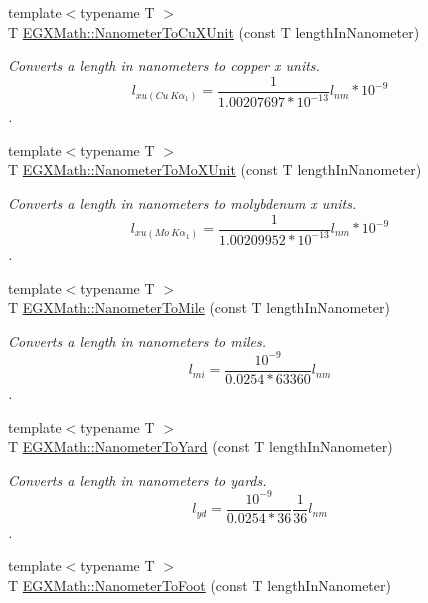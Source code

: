 \begin{DoxyCompactItemize}
{\footnotesize template$<$typename T $>$ }\\T \mbox{\hyperlink{group___e_g_x_math-_conversions-_length_conversions-_s_i-_nanometer-_non-_s_i_ga59399657caa5a9c81df2ffbe1ff7683c}{E\+G\+X\+Math\+::\+Nanometer\+To\+Cu\+X\+Unit}} (const T length\+In\+Nanometer)
\begin{DoxyCompactList}\small\item\em Converts a length in nanometers to copper x units. \[ l_{xu(Cu\ K\alpha_1)}= \frac{1}{1.00207697*10^{-13}} l_{nm} * 10^{-9}\]. \end{DoxyCompactList}\item 
{\footnotesize template$<$typename T $>$ }\\T \mbox{\hyperlink{group___e_g_x_math-_conversions-_length_conversions-_s_i-_nanometer-_non-_s_i_gacc6d7fa95c35687718c816df3c95c7b5}{E\+G\+X\+Math\+::\+Nanometer\+To\+Mo\+X\+Unit}} (const T length\+In\+Nanometer)
\begin{DoxyCompactList}\small\item\em Converts a length in nanometers to molybdenum x units. \[ l_{xu(Mo\ K\alpha_1)}=\frac{1}{1.00209952*10^{-13}} l_{nm} * 10^{-9}\]. \end{DoxyCompactList}\item 
{\footnotesize template$<$typename T $>$ }\\T \mbox{\hyperlink{group___e_g_x_math-_conversions-_length_conversions-_s_i-_nanometer-_imperial_gadbf1e269e14b8afcd128aa5534f28a5e}{E\+G\+X\+Math\+::\+Nanometer\+To\+Mile}} (const T length\+In\+Nanometer)
\begin{DoxyCompactList}\small\item\em Converts a length in nanometers to miles. \[ l_{mi}=\frac{10^{-9}}{0.0254 * 63360} l_{nm} \]. \end{DoxyCompactList}\item 
{\footnotesize template$<$typename T $>$ }\\T \mbox{\hyperlink{group___e_g_x_math-_conversions-_length_conversions-_s_i-_nanometer-_imperial_ga1f2313a0bf1527690778a6dace0db853}{E\+G\+X\+Math\+::\+Nanometer\+To\+Yard}} (const T length\+In\+Nanometer)
\begin{DoxyCompactList}\small\item\em Converts a length in nanometers to yards. \[ l_{yd}= \frac{10^{-9}}{0.0254 * 36} \frac{1}{36} l_{nm} \]. \end{DoxyCompactList}\item 
{\footnotesize template$<$typename T $>$ }\\T \mbox{\hyperlink{group___e_g_x_math-_conversions-_length_conversions-_s_i-_nanometer-_imperial_ga7c6124e07aa11d37695c96c5a520197d}{E\+G\+X\+Math\+::\+Nanometer\+To\+Foot}} (const T length\+In\+Nanometer)

\end{DoxyCompactItemize}
